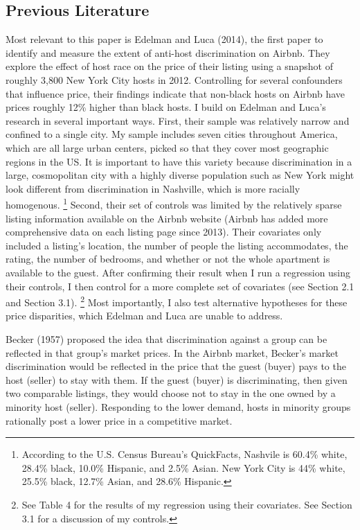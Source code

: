 \subsection{Previous Literature} 
Most relevant to this paper is Edelman and Luca (2014), the first paper to identify and measure the extent of anti-host discrimination on Airbnb.\cite{edelman} They explore the effect of host race on the price of their listing using a snapshot of roughly 3,800 New York City hosts in 2012. Controlling for several confounders that influence price, their findings indicate that non-black hosts on Airbnb have prices roughly 12\% higher than black hosts. I build on Edelman and Luca's research in several important ways. First, their sample was relatively narrow and confined to a single city. My sample includes seven cities throughout America, which are all large urban centers, picked so that they cover most geographic regions in the US. It is important to have this variety because discrimination in a large, cosmopolitan city with a highly diverse population such as New York might look different from discrimination in Nashville, which is more racially homogenous.%
	\footnote{According to the U.S. Census Bureau's QuickFacts, Nashvile is 60.4\% white, 28.4\% black, 10.0\% Hispanic, and 2.5\% Asian. New York City is 44\% white, 25.5\% black, 12.7\% Asian, and 28.6\% Hispanic.} 
Second, their set of controls was limited by the relatively sparse listing information available on the Airbnb website (Airbnb has added more comprehensive data on each listing page since 2013). Their covariates only included a listing's location, the number of people the listing accommodates, the rating, the number of bedrooms, and whether or not the whole apartment is available to the guest. After confirming their result when I run a regression using their controls, I then control for a more complete set of covariates (see Section 2.1 and Section 3.1).%
	\footnote{See Table 4 for the results of my regression using their covariates. See Section 3.1 for a discussion of my controls.} 
Most importantly, I also test alternative hypotheses for these price disparities, which Edelman and Luca are unable to address. 

Becker (1957) proposed the idea that discrimination against a group can be reflected in that group's market prices.\cite{becker} In the Airbnb market, Becker's market discrimination would be reflected in the price that the guest (buyer) pays to the host (seller) to stay with them. If the guest (buyer) is discriminating, then given two comparable listings, they would choose not to stay in the one owned by a minority host (seller). Responding to the lower demand, hosts in minority groups rationally post a lower price in a competitive market. 

